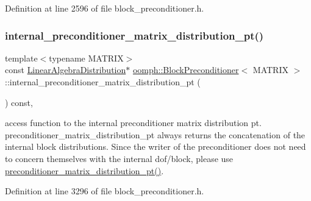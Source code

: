 Definition at line 2596 of file block\+\_\+preconditioner.\+h.

\mbox{\label{classoomph_1_1BlockPreconditioner_a3a16de88bd5369e729d761a6498fdd3f}} 
\subsubsection{\texorpdfstring{internal\+\_\+preconditioner\+\_\+matrix\+\_\+distribution\+\_\+pt()}{internal\_preconditioner\_matrix\_distribution\_pt()}}
{\footnotesize\ttfamily template$<$typename M\+A\+T\+R\+IX$>$ \\
const \hyperlink{classoomph_1_1LinearAlgebraDistribution}{Linear\+Algebra\+Distribution}$\ast$ \hyperlink{classoomph_1_1BlockPreconditioner}{oomph\+::\+Block\+Preconditioner}$<$ M\+A\+T\+R\+IX $>$\+::internal\+\_\+preconditioner\+\_\+matrix\+\_\+distribution\+\_\+pt (\begin{DoxyParamCaption}{ }\end{DoxyParamCaption}) const\hspace{0.3cm}{\ttfamily [inline]}, {\ttfamily [protected]}}



access function to the internal preconditioner matrix distribution pt. preconditioner\+\_\+matrix\+\_\+distribution\+\_\+pt always returns the concatenation of the internal block distributions. Since the writer of the preconditioner does not need to concern themselves with the internal dof/block, please use \hyperlink{classoomph_1_1BlockPreconditioner_a74eeff188f842dd8abdff1b7d9801d44}{preconditioner\+\_\+matrix\+\_\+distribution\+\_\+pt()}. 



Definition at line 3296 of file block\+\_\+preconditioner.\+h.

\mbox{\label{classoomph_1_1BlockPreconditioner_a679a82067056628cc4bbc8bb68d088f2}} 
